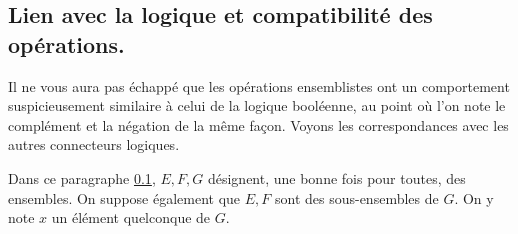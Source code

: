 \newpage

\subsection{Lien avec la logique et compatibilité des opérations.}
\label{sets_log}

Il ne vous aura pas échappé que les opérations ensemblistes ont un comportement suspicieusement similaire à celui de la logique booléenne, au point où l'on note le complément et la négation de la même façon. Voyons les correspondances avec les autres connecteurs logiques.

Dans ce paragraphe \ref{sets_log}, $E,F,G$ désignent, une bonne fois pour toutes, des ensembles. On suppose également que $E, F$ sont des sous-ensembles de $G$. On y note $x$ un élément quelconque de $G$.

